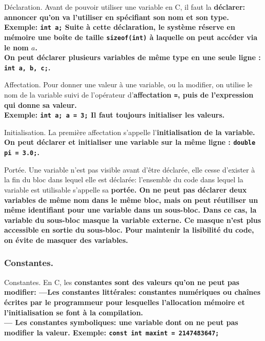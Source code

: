 \documentclass[french, 11pt]{article}
\begin{document}
\begin{defi}{Déclaration.}{}
    Avant de pouvoir utiliser une variable en C, il faut la \bf{déclarer}: annoncer qu'on va l'utiliser en spécifiant son nom et son type.\\
    \bf{Exemple:} \texttt{int a;}\n
    Suite à cette déclaration, le système réserve en mémoire une boîte de taille \texttt{sizeof(int)} à laquelle on peut accéder via le nom $a$.\\
    On peut déclarer plusieurs variables de même type en une seule ligne : \texttt{int a, b, c;}.
\end{defi}

\begin{defi}{Affectation.}{}
    Pour donner une valeur à une variable, ou la modifier, on utilise le nom de la variable suivi de l'opérateur d'\bf{affectation} \texttt{=}, puis de l'expression qui donne sa valeur.\\
    \bf{Exemple:} \texttt{int a; a = 3;}\n
    Il faut \bf{toujours} initialiser les valeurs.
\end{defi}

\begin{defi}{Initialisation.}{}
    La première affectation s'appelle l'\bf{initialisation} de la variable.\\
    On peut déclarer et initialiser une variable sur la même ligne : \texttt{double pi = 3.0;}.
\end{defi}

\begin{defi}{Portée.}{}
    Une variable n'est pas visible avant d'être déclarée, elle cesse d'exister à la fin du bloc dans lequel elle est déclarée: l'ensemble du code dans lequel la variable est utilisable s'appelle sa \bf{portée}.\n
    On ne peut pas déclarer deux variables de même nom dans le même bloc, mais on peut réutiliser un même identifiant pour une variable dans un sous-bloc. Dans ce cas, la variable du sous-bloc masque la variable externe. Ce masque n'est plus accessible en sortie du sous-bloc.\n
    Pour maintenir la lisibilité du code, on évite de masquer des variables.
\end{defi}

\subsubsection{Constantes.}

\begin{defi}{Constantes.}{}
    En C, les \bf{constantes} sont des valeurs qu'on ne peut pas modifier:
    ---Les constantes littérales: constantes numériques ou chaînes écrites par le programmeur pour lesquelles l'allocation mémoire et l'initialisation se font à la compilation.\\
    --- Les constantes symboliques: une variable dont on ne peut pas modifier la valeur.\n
    \bf{Exemple:} \texttt{const int maxint = 2147483647;}
\end{defi}
\end{document}
